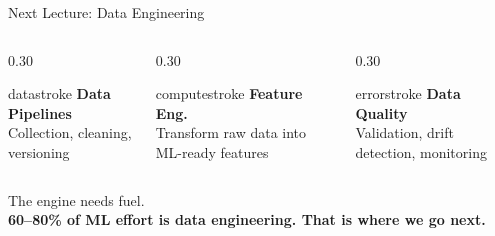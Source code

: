 \documentclass[aspectratio=169, 12pt]{beamer}
\begin{document}
\begin{frame}{Next Lecture: Data Engineering}
\note{
%
%
}

\footnotesize
\begin{columns}[c]
  \begin{column}{0.30\textwidth}
    \centering
    \begin{mlsyscard}{datastroke}
    {\large\bfseries Data Pipelines}\\[0.1cm]
    {\footnotesize Collection, cleaning, versioning}
    \end{mlsyscard}
  \end{column}
  \begin{column}{0.30\textwidth}
    \centering
    \begin{mlsyscard}{computestroke}
    {\large\bfseries Feature Eng.}\\[0.1cm]
    {\footnotesize Transform raw data into ML-ready features}
    \end{mlsyscard}
  \end{column}
  \begin{column}{0.30\textwidth}
    \centering
    \begin{mlsyscard}{errorstroke}
    {\large\bfseries Data Quality}\\[0.1cm]
    {\footnotesize Validation, drift detection, monitoring}
    \end{mlsyscard}
  \end{column}
\end{columns}

\vspace{0.3cm}
\centering
{\normalsize The engine needs fuel.}\\[0.1cm]
{\small\textbf{60--80\% of ML effort is data engineering. That is where we go next.}}

\end{frame}


\appendix
\end{document}
